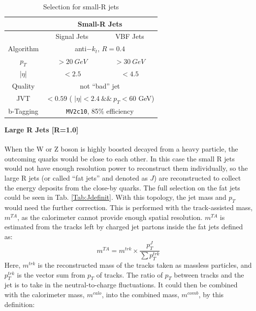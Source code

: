 \begin{table}[tbh]
	\caption{Selection for small-R jets}\label{tab:sjdefinit}
	\vspace{2.0em}
	\centering
	\begin{tabular}{|c||c|c|}
		\hline
		             & \multicolumn{2}{|c|}{ Small-R Jets }\\
		\hline
		             & Signal Jets & VBF Jets \\
		\hline
		Algorithm    & \multicolumn{2}{|c|}{ anti$-k_t$, $R=0.4$}\\
		\hline
		$p_T$        & $>20~GeV$ & $>30~GeV$\\
		\hline
		|$\eta$|     & $< 2.5$ & $<4.5$  \\
		\hline
		Quality      & \multicolumn{2}{|c|}{not ``bad'' jet}\\
		\hline
		JVT          & \multicolumn{2}{|c|}{$< 0.59$ ( $| \eta | < 2.4 ~ \& \& ~p_T < 60 $ GeV)} \\
		\hline
		b-Tagging    & \multicolumn{2}{|c|}{\texttt{MV2c10}, 85\% efficiency} \\
		\hline
	\end{tabular}
\end{table}
\noindent
{\bf Large R Jets [R=1.0]}
\\
\\When the W or Z boson is highly boosted decayed from a heavy particle, the outcoming quarks would be close to each other. In this case the small R jets would not have enough resolution power to reconstruct them individually, so the large R jets (or called ``fat jets'' and denoted as $J$) are reconstructed to collect the energy deposits from the close-by quarks. The full selection on the fat jets could be seen in Tab. \ref{Tab:Jdefinit}. With this topology, the jet mass and $p_{T}$ would need the further correction. This is performed with the track-assisted mass, $m^{TA}$, as the calorimeter cannot provide enough spatial resolution. $m^{TA}$ is estimated from the tracks left by charged jet partons inside the fat jets defined as:
\begin{equation}
m^{TA} = m^{trk} \times \frac{p_{T}^{J}}{\sum p_{T}^{trk}}
\end{equation}  
Here, $m^{trk}$ is the reconstructed mass of the tracks taken as massless particles, and $p_{T}^{trk}$ is the vector sum from $p_{T}$ of tracks.  The ratio of $p_{T}$ between tracks and the jet is to take in the neutral-to-charge fluctuations. It could then be combined with the calorimeter mass, $m^{calo}$, into the combined mass, $m^{comb}$, by this definition:
